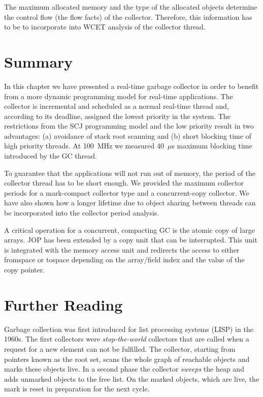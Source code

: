 The maximum allocated memory and the type of the allocated objects
determine the control flow (the flow facts) of the collector.
Therefore, this information has to be to incorporate into WCET
analysis of the collector thread.

\section{Summary} \label{sec:gc:summery}

In this chapter we have presented a real-time garbage collector in
order to benefit from a more dynamic programming model for real-time
applications. The collector is incremental and scheduled as a normal
real-time thread and, according to its deadline, assigned the lowest
priority in the system. The restrictions from the SCJ programming
model and the low priority result in two advantages: (a) avoidance of
stack root scanning and (b) short blocking time of high priority
threads. At 100~MHz we measured 40~$\mu$s maximum blocking time
introduced by the GC thread.

To guarantee that the applications will not run out of memory, the
period of the collector thread has to be short enough. We provided
the maximum collector periods for a mark-compact collector type and a
concurrent-copy collector. We have also shown how a longer lifetime
due to object sharing between threads can be incorporated into the
collector period analysis.

A critical operation for a concurrent, compacting GC is the atomic
copy of large arrays. JOP has been extended by a copy unit that can
be interrupted. This unit is integrated with the memory access unit
and redirects the access to either fromspace or tospace depending on
the array/field index and the value of the copy pointer.

\section{Further Reading}

Garbage collection was first introduced for list processing systems
(LISP) in the 1960s. The first collectors were \emph{stop-the-world}
collectors that are called when a request for a new element can not
be fulfilled. The collector, starting from pointers known as the root
set, scans the whole graph of reachable objects and marks these
objects live. In a second phase the collector \emph{sweeps} the heap
and adds unmarked objects to the free list. On the marked objects,
which are live, the mark is reset in preparation for the next cycle.

